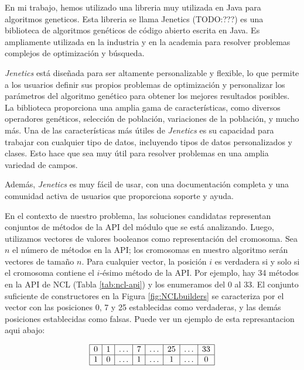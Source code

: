 En mi trabajo, hemos utilizado una libreria muy utilizada en Java para algoritmos geneticos. Esta libreria se llama Jenetics (TODO:???) es una biblioteca de algoritmos genéticos de código abierto escrita en Java. Es ampliamente utilizada en la industria y en la academia para resolver problemas complejos de optimización y búsqueda.


\emph{Jenetics} está diseñada para ser altamente personalizable y flexible, lo que permite a los usuarios definir sus propios problemas de optimización y personalizar los parámetros del algoritmo genético para obtener los mejores resultados posibles. La biblioteca proporciona una amplia gama de características, como diversos operadores genéticos, selección de población, variaciones de la población, y mucho más.
Una de las características más útiles de \emph{Jenetics} es su capacidad para trabajar con cualquier tipo de datos, incluyendo tipos de datos personalizados y clases. Esto hace que sea muy útil para resolver problemas en una amplia variedad de campos.

Además, \emph{Jenetics} es muy fácil de usar, con una documentación completa y una comunidad activa de usuarios que proporciona soporte y ayuda. 

En el contexto de nuestro problema, las soluciones candidatas representan conjuntos de métodos de la API del módulo que se está analizando. Luego, utilizamos vectores de valores booleanos como representación del cromosoma. Sea $n$ el número de métodos en la API; los cromosomas en nuestro algoritmo serán vectores de tamaño $n$. Para cualquier vector, la posición $i$ es verdadera si y solo si el cromosoma contiene el $i$-ésimo método de la API. Por ejemplo, hay 34 métodos en la API de NCL (Tabla \ref{tab:ncl-api}) y los enumeramos del 0 al 33. El conjunto suficiente de constructores en la Figura \ref{fig:NCLbuilders} se caracteriza por el vector con las posiciones 0, 7 y 25 establecidas como verdaderas, y las demás posiciones establecidas como falsas. Puede ver un ejemplo de esta represantacion aqui abajo:

\[
\begin{array}{|*{8}{c|}}
\hline
0 & 1 & \ldots  & 7 & \ldots  & 25  & \ldots  & 33 \\
\hline
1 & 0 & \ldots  & 1 & \ldots  & 1  & \ldots  & 0 \\
\hline
\end{array}
\]



